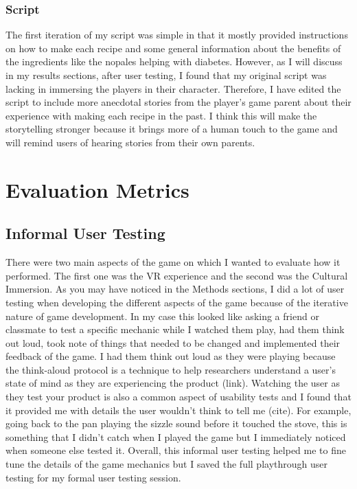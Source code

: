 \documentclass[10pt,twocolumn]{article}
\begin{document}
\subsubsection{Script}
The first iteration of my script was simple in that it mostly provided instructions on how to make each recipe and some general information about the benefits of the ingredients like the nopales helping with diabetes. However, as I will discuss in my results sections, after user testing, I found that my original script was lacking in immersing the players in their character. Therefore, I have edited the script to include more anecdotal stories from the player’s game parent about their experience with making each recipe in the past. I think this will make the storytelling stronger because it brings more of a human touch to the game and will remind users of hearing stories from their own parents.

\section{Evaluation Metrics}
\subsection{Informal User Testing}
There were two main aspects of the game on which I wanted to evaluate how it performed. The first one was the VR experience and the second was the Cultural Immersion. As you may have noticed in the Methods sections, I did a lot of user testing when developing the different aspects of the game because of the iterative nature of game development. In my case this looked like asking a friend or classmate to test a specific mechanic while I watched them play, had them think out loud, took note of things that needed to be changed and implemented their feedback of the game. I had them think out loud as they were playing because the think-aloud protocol is a technique to help researchers understand a user's state of mind as they are experiencing the product (link). Watching the user as they test your product is also a common aspect of usability tests and I found that it provided me with details the user wouldn't think to tell me (cite). For example, going back to the pan playing the sizzle sound before it touched the stove, this is something that I didn’t catch when I played the game but I immediately noticed when someone else tested it. Overall, this informal user testing helped me to fine tune the details of the game mechanics but I saved the full playthrough user testing for my formal user testing session.
\end{document}
